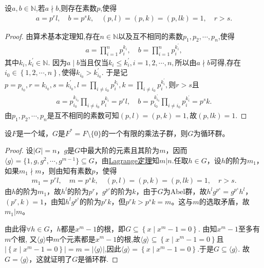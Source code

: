 \documentclass[../../main.tex]{subfiles}%
\begin{document}
\begin{proposition}\label{proposition:整除与不整除与素因子分解的相关定理}
设$a,b\in \mathbb{N}$,若$a\nmid b$,则存在素数$p$,使得
\begin{align*}
a=p^rl,\quad b=p^sk,\quad (p,l)=(p,k)=(p,lk)=1,\quad r>s.
\end{align*}
\end{proposition}
\begin{proof}

由算术基本定理知,存在$n\in \mathbb{N}$以及互不相同的素数$p_1,p_2,\cdots ,p_n$,使得
\begin{align*} a=\prod\limits_{i=1}^n{p_{i}^{k_i}},\quad b=\prod\limits_{i=1}^n{p_{i}^{k_{i}^{\prime}}}, \end{align*}
其中$k_i,k_{i}^{\prime}\in \mathbb{N}.$
因为$a\mid b$当且仅当$k_i\leqslant k_{i}^{\prime},i=1,2,\cdots ,n,$所以由$a\nmid b$可得,存在$i_0\in \left\{ 1,2,\cdots ,n \right\} ,$使得$k_{i_0}>k_{i_0}^{\prime}.$
于是记$p=p_{i_0},r=k_{i_0},s=k_{i_0}^{\prime},l=\prod\limits_{i\ne i_0}{p_{i}^{k_i}},k=\prod\limits_{i\ne i_0}{p_{i}^{k_{i}^{\prime}}},$则$r>s$且
\begin{align*} 
a=p_{i_0}^{k_{i_0}}\prod\limits_{i\ne i_0}{p_{i}^{k_i}}=p^rl,\quad b=p_{i_0}^{k_{i_0}^{\prime}}\prod\limits_{i\ne i_0}{p_{i}^{k_{i}^{\prime}}}=p^sk. 
\end{align*}
由$p_1,p_2,\cdots ,p_n$是互不相同的素数可知$(p,l)=(p,k)=1,$故$(p,lk)=1.$

\end{proof}

\begin{theorem}\label{theorem:抽象代数--定理2.6.2}
设$F$是一个域，$G$是$F^*=F\setminus\{0\}$的一个有限的乘法子群，则$G$为循环群。
\end{theorem}
\begin{proof}

设$|G|=n$，$g$是$G$中最大阶的元素且其阶为$m$，因而$\langle g\rangle=\{1,g,g^2,\cdots,g^{m-1}\}\subseteq G$，由\hyperref[theorem:抽象代数--Lagrange定理]{Lagrange定理}知$m|n$.任取$h\in G$，设$h$的阶为$m_1$，如果$m_1\nmid m$，则由知有素数$p$，使得
\begin{align*}
m_1=p^rl,\quad m=p^sk,\quad (p,l)=(p,k)=(p,lk)=1,\quad r>s.
\end{align*}
由$h$的阶为$m_1$，故$h^l$的阶为$p^r$，$g^{p^s}$的阶为$k$，由于$G$为Abel群，故$h^lg^{p^s}=g^{p^s}h^l$，$(p^r,k)=1$，由知$h^lg^{p^s}$的阶为$p^rk$，但$p^rk>p^sk=m$。这与$m$的选取矛盾，故$m_1|m$。

由此得$\forall h\in G$，$h$都是$x^m-1$的根，即$G\subseteq \left\{ x\mid x^m-1=0 \right\} .$
由知$x^m-1$至多有$m$个根,
又$\langle g\rangle$中$m$个元素都是$x^m-1$的根,故$\langle g\rangle\subseteq \left\{ x\mid x^m-1=0 \right\}$且$\left| \left\{ x\mid x^m-1=0 \right\} \right|=m=|\langle g\rangle|$,因此$\langle g\rangle= \left\{ x\mid x^m-1=0 \right\}.$于是$G\subseteq \langle g\rangle.$
故$G=\langle g\rangle$，这就证明了$G$是循环群.

\end{proof}
\end{document}
